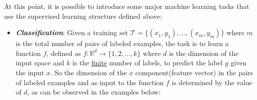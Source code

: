 \vspace{5mm}

At this point, it is possible to introduce some major machine learning
tasks that use the supervised learning structure defined above:

\begin{itemize}
      \item \emph{\textbf{Classification}}: Given a training set
            $\mathcal{T}=\{(x_1,y_1),...,(x_m,y_m)\}$ where
            $m$ is the total number of pairs of labeled examples,
            the task is to learn a function $f$, defined as
            $f : \mathbb{R}^d \rightarrow \{1,2,...,k\}$ where $d$
            is the dimension of the input space and $k$ is the
            \underline{finite} number of labels, to predict the label
            $y$ given the input $x$. So the dimension of the $x$
            component(feature vector) in the pairs of labeled examples
            and as input to the function $f$ is determined by the value
            of $d$, as can be observed in the examples below:

            \vspace{5mm}


\end{itemize}
